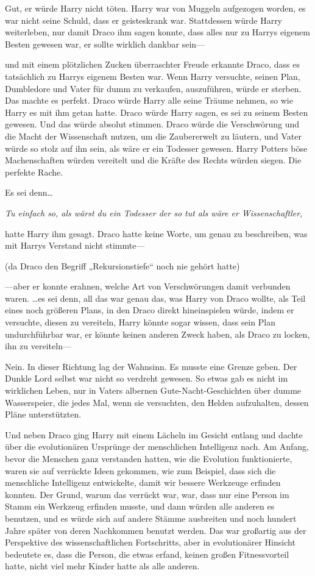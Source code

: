 {Gut, er würde Harry nicht töten. Harry war von Muggeln aufgezogen worden, es war nicht seine Schuld, dass er geisteskrank war. Stattdessen würde Harry weiterleben, nur damit Draco ihm sagen konnte, dass alles nur zu Harrys eigenem Besten gewesen war, er sollte wirklich dankbar sein—

und mit einem plötzlichen Zucken überraschter Freude erkannte Draco, dass es tatsächlich zu Harrys eigenem Besten war. Wenn Harry versuchte, seinen Plan, Dumbledore und Vater für dumm zu verkaufen, auszuführen, würde er sterben. Das machte es perfekt. Draco würde Harry alle seine Träume nehmen, so wie Harry es mit ihm getan hatte. Draco würde Harry sagen, es sei zu seinem Besten gewesen. Und das würde absolut stimmen. Draco würde die Verschwörung und die Macht der Wissenschaft nutzen, um die Zaubererwelt zu läutern, und Vater würde so stolz auf ihn sein, als wäre er ein Todesser gewesen. Harry Potters böse Machenschaften würden vereitelt und die Kräfte des Rechts würden siegen. Die perfekte Rache.

Es sei denn…

\emph{Tu einfach so, als wärst du ein Todesser der so tut als wäre er Wissenschaftler},

hatte Harry ihm gesagt. Draco hatte keine Worte, um genau zu beschreiben, was mit Harrys Verstand nicht stimmte—

(da Draco den Begriff „Rekursionstiefe“ noch nie gehört hatte)

—aber er konnte erahnen, welche Art von Verschwörungen damit verbunden waren. …es sei denn, all das war genau das, was Harry von Draco wollte, als Teil eines noch größeren Plans, in den Draco direkt hineinspielen würde, indem er versuchte, diesen zu vereiteln, Harry könnte sogar wissen, dass sein Plan undurchführbar war, er könnte keinen anderen Zweck haben, als Draco zu locken, ihn zu vereiteln—

Nein. In dieser Richtung lag der Wahnsinn. Es musste eine Grenze geben. Der Dunkle Lord selbst war nicht so verdreht gewesen. So etwas gab es nicht im wirklichen Leben, nur in Vaters albernen Gute-Nacht-Geschichten über dumme Wasserspeier, die jedes Mal, wenn sie versuchten, den Helden aufzuhalten, dessen Pläne unterstützten.

Und neben Draco ging Harry mit einem Lächeln im Gesicht entlang und dachte über die evolutionären Ursprünge der menschlichen Intelligenz nach. Am Anfang, bevor die Menschen ganz verstanden hatten, wie die Evolution funktionierte, waren sie auf verrückte Ideen gekommen, wie zum Beispiel, dass sich die menschliche Intelligenz entwickelte, damit wir bessere Werkzeuge erfinden konnten. Der Grund, warum das verrückt war, war, dass nur eine Person im Stamm ein Werkzeug erfinden musste, und dann würden alle anderen es benutzen, und es würde sich auf andere Stämme ausbreiten und noch hundert Jahre später von deren Nachkommen benutzt werden. Das war großartig aus der Perspektive des wissenschaftlichen Fortschritts, aber in evolutionärer Hinsicht bedeutete es, dass die Person, die etwas erfand, keinen großen Fitnessvorteil hatte, nicht viel mehr Kinder hatte als alle anderen.

}
